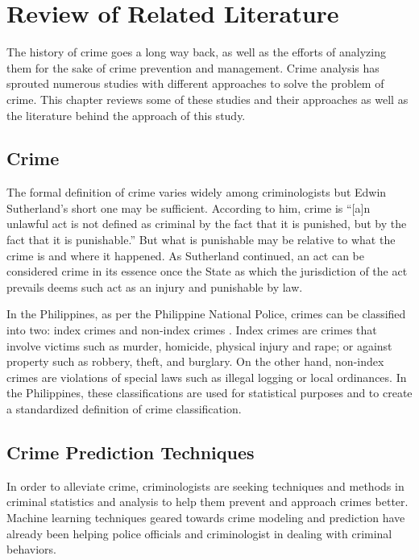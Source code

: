 \chapter{Review of Related Literature}
    The history of crime goes a long way back, as well as the efforts of analyzing them for the sake of crime prevention and management. Crime analysis has sprouted numerous studies with different approaches to solve the problem of crime. This chapter reviews some of these studies and their approaches as well as the literature behind the approach of this study.
\section{Crime}
    The formal definition of crime varies widely among criminologists but Edwin Sutherland’s short one may be sufficient. According to him, crime is “[a]n unlawful act is not defined as criminal by the fact that it is punished, but by the fact that it is punishable.” \citep{brown2010criminology} But what is punishable may be relative to what the crime is and where it happened. As Sutherland continued, an act can be considered crime in its essence once the State as which the jurisdiction of the act prevails deems such act as an injury and punishable by law.

    In the Philippines, as per the Philippine National Police, crimes can be classified into two: index crimes and non-index crimes \citep{senate2013criminal}. Index crimes are crimes that involve victims such as murder, homicide, physical injury and rape; or against property such as robbery, theft, and burglary. On the other hand, non-index crimes are violations of special laws such as illegal logging or local ordinances. In the Philippines, these classifications are used for statistical purposes and to create a standardized definition of crime classification\citep{tumulak2015crime}.

\section{Crime Prediction Techniques}
    In order to alleviate crime, criminologists are seeking techniques and methods in criminal statistics and analysis to help them prevent and approach crimes better. Machine learning techniques geared towards crime modeling and prediction have already been helping police officials and criminologist in dealing with criminal behaviors.

